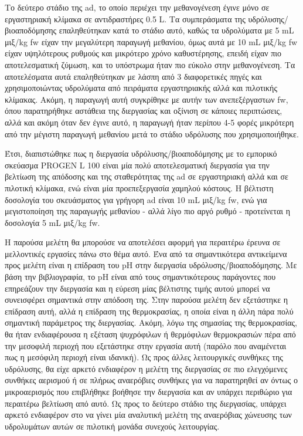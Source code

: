 \documentclass[11pt]{report}
\begin{document}
Το δεύτερο στάδιο της \acrshort{ad}, το οποίο περιέχει την μεθανογένεση έγινε μόνο σε εργαστηριακή κλίμακα σε αντιδραστήρες 0.5 L. Τα συμπεράσματα της υδρόλυσης/βιοαποδόμησης επαληθεύτηκαν κατά το στάδιο αυτό, καθώς τα υδρολύματα με 5 mL μιξ/kg \acrshort{fw} είχαν την μεγαλύτερη παραγωγή μεθανίου, όμως αυτά με 10 mL μιξ/kg \acrshort{fw} είχαν υψηλότερους ρυθμούς και μικρότερο χρόνο καθυστέρησης, επειδή είχαν πιο αποτελεσματική ζύμωση, και το υπόστρωμα ήταν πιο εύκολο στην μεθανογένεση. Τα αποτελέσματα αυτά επαληθεύτηκαν με λάσπη από 3 διαφορετικές πηγές και χρησιμοποιώντας υδρολύματα από πειράματα εργαστηριακής αλλά και πιλοτικής κλίμακας. Ακόμη, η παραγωγή αυτή συγκρίθηκε με αυτήν των ανεπεξέργαστων \acrshort{fw}, όπου παρατηρήθηκε αστάθεια της διεργασίας και οξίνιση σε κάποιες περιπτώσεις, αλλά και ακόμη όταν δεν έγινε αυτό, η παραγωγή ήταν περίπου 4-5 φορές μικρότερη από την μέγιστη παραγωγή μεθανίου μετά το στάδιο υδρόλυσης που χρησιμοποιήθηκε.

Έτσι, διαπιστώθηκε πως η διεργασία υδρόλυσης/βιοαποδόμησης με το εμπορικό σκεύασμα PROGEN L 100 είναι μία πολύ αποτελεσματική διεργασία για την βελτίωση της απόδοσης και της σταθερότητας της \acrshort{ad} σε εργαστηριακή αλλά και σε πιλοτική κλίμακα, ενώ είναι μία προεπεξεργασία χαμηλού κόστους. Η βέλτιστη δοσολογία του σκευάσματος για γρήγορη \acrshort{ad} είναι 10 mL μιξ/kg \acrshort{fw}, ενώ για μεγιστοποίηση της παραγωγής μεθανίου - αλλά λίγο πιο αργό ρυθμό - προτείνεται η δοσολογία 5 mL μιξ/kg \acrshort{fw}.

Η παρούσα μελέτη θα μπορούσε να αποτελέσει αφορμή για περαιτέρω έρευνα σε μελλοντικές εργασίες πάνω στο θέμα αυτό. Ένα από τα σημαντικότερα αντικείμενα προς μελέτη είναι η επίδραση του pH στην διεργασία υδρόλυσης/βιοαποδόμησης. Με βάση την βιβλιογραφία, το pH είναι από τους σημαντικότερους παράγοντες που επηρεάζουν την διεργασία και η εύρεση μίας βέλτιστης τιμής αυτού μπορεί να συνεισφέρει σημαντικά στην απόδοση της. Στην παρούσα μελέτη δεν εξετάστηκε η επίδραση αυτή, αλλά η επίδραση της θερμοκρασίας, η οποία είναι η άλλη πάρα πολύ σημαντική παράμετρος της διεργασίας. Ακόμη, λόγω της σημασίας της θερμοκρασίας, θα ήταν ενδιαφέρουσα η εξέταση ψυχρόφιλων ή θερμόφιλων θερμοκρασιών πέρα από την μεσοφιλή περιοχή που εξετάστηκε στην εργασία αυτή (παρόλο που αναμένεται πως η μεσόφιλη περιοχή είναι ιδανική). Ως προς άλλες λειτουργικές συνθήκες της υδρόλυσης, θα είχε αρκετό ενδιαφέρον η μελέτη της διεργασίας σε πιο ελεγχόμενες συνθήκες αερισμού ή σε πλήρως αναερόβιες συνθήκες για να παρατηρηθεί αν όντως ο μικροαερισμός που επιβλήθηκε βοήθησε την διεργασία και αν υπάρχει περιθώριο για περαιτέρω βελτίωση από αυτό. Ως προς το δεύτερο στάδιο της διεργασίας, υπάρχει αρκετό ενδιαφέρον στο να γίνει μία αναλυτική μελέτη της αναερόβιας χώνευσης των υδρολυμάτων αυτών σε πιλοτική μονάδα συνεχούς λειτουργίας.
\end{document}
